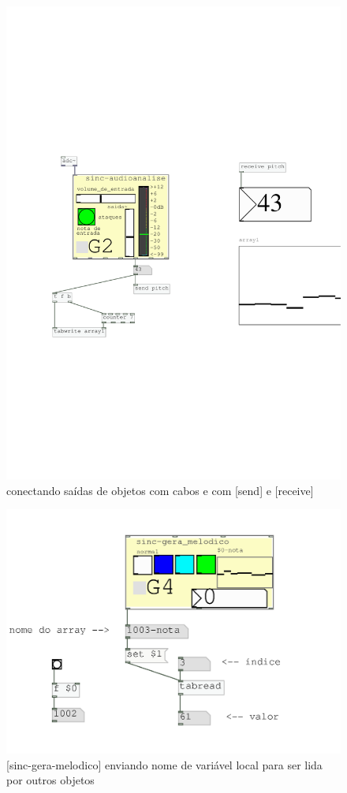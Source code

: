 \documentclass{ppgmus}
\begin{document}
\begin{figure}
\includegraphics[scale=.6]{ex-conexoes}
\caption{conectando saídas de objetos com cabos e com [send] e [receive]}
\label{ex-conexoes}
\end{figure}


\begin{figure}
\includegraphics[scale=.6]{ex-variaveis}
\caption{[sinc-gera-melodico] enviando nome de variável local para ser lida por outros objetos}
\label{ex-variaveis}
\end{figure}
\end{document}
